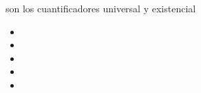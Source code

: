 \begin{frame}
  \frametitle{}
      \begin{defi}
      \end{defi}
      \pause


      \begin{block}{}
				son los cuantificadores universal y existencial
           \begin{itemize}[<+->]
           \item 
           \item 
           \item 
           \item 
           \item 
           \end{itemize}
			\end{block}

      \pause
      \begin{block}{}
			\end{block}
\end{frame}
